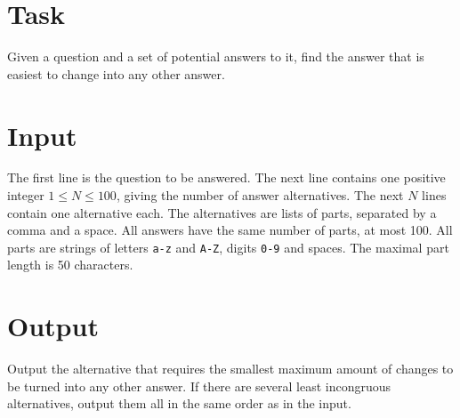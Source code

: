 \section*{Task}
Given a question and a set of potential answers to it, find the answer that is easiest to change
into any other answer.

\section*{Input}
The first line is the question to be answered. The next line contains one positive integer $1 \leq N
\leq 100$, giving the number of answer alternatives. The next $N$ lines contain one alternative each.
The alternatives are lists of parts, separated by a comma and a space. All answers have
the same number of parts, at most 100. All parts are strings of letters \texttt{a-z} and
\texttt{A-Z}, digits \texttt{0-9} and spaces. The maximal part length is 50 characters.

\section*{Output}

Output the alternative that requires the smallest maximum amount of changes to be turned into any
other answer. If there are several least incongruous alternatives, output them all in the same order as in the input.
